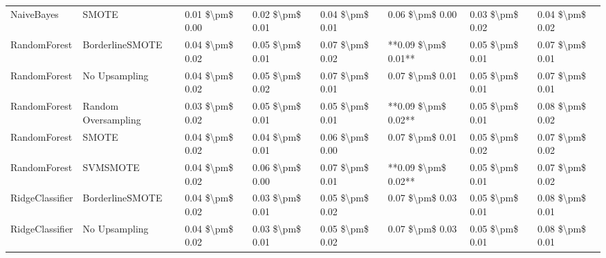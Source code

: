\begin{tabular}{llllllll}
                     NaiveBayes &                         SMOTE & 0.01 \$\textbackslash pm\$ 0.00 &           0.02 \$\textbackslash pm\$ 0.01 &       0.04 \$\textbackslash pm\$ 0.01 &        0.06 \$\textbackslash pm\$ 0.00 &                         0.03 \$\textbackslash pm\$ 0.02 &     0.04 \$\textbackslash pm\$ 0.02 \\
                   RandomForest &               BorderlineSMOTE & 0.04 \$\textbackslash pm\$ 0.02 &           0.05 \$\textbackslash pm\$ 0.01 &       0.07 \$\textbackslash pm\$ 0.02 &    **0.09 \$\textbackslash pm\$ 0.01** &                         0.05 \$\textbackslash pm\$ 0.01 &     0.07 \$\textbackslash pm\$ 0.01 \\
                   RandomForest &                 No Upsampling & 0.04 \$\textbackslash pm\$ 0.02 &           0.05 \$\textbackslash pm\$ 0.02 &       0.07 \$\textbackslash pm\$ 0.01 &        0.07 \$\textbackslash pm\$ 0.01 &                         0.05 \$\textbackslash pm\$ 0.01 &     0.07 \$\textbackslash pm\$ 0.01 \\
                   RandomForest &           Random Oversampling & 0.03 \$\textbackslash pm\$ 0.02 &           0.05 \$\textbackslash pm\$ 0.01 &       0.05 \$\textbackslash pm\$ 0.01 &    **0.09 \$\textbackslash pm\$ 0.02** &                         0.05 \$\textbackslash pm\$ 0.01 &     0.08 \$\textbackslash pm\$ 0.02 \\
                   RandomForest &                         SMOTE & 0.04 \$\textbackslash pm\$ 0.02 &           0.04 \$\textbackslash pm\$ 0.01 &       0.06 \$\textbackslash pm\$ 0.00 &        0.07 \$\textbackslash pm\$ 0.01 &                         0.05 \$\textbackslash pm\$ 0.02 &     0.07 \$\textbackslash pm\$ 0.02 \\
                   RandomForest &                      SVMSMOTE & 0.04 \$\textbackslash pm\$ 0.02 &           0.06 \$\textbackslash pm\$ 0.00 &       0.07 \$\textbackslash pm\$ 0.01 &    **0.09 \$\textbackslash pm\$ 0.02** &                         0.05 \$\textbackslash pm\$ 0.01 &     0.07 \$\textbackslash pm\$ 0.02 \\
                RidgeClassifier &               BorderlineSMOTE & 0.04 \$\textbackslash pm\$ 0.02 &           0.03 \$\textbackslash pm\$ 0.01 &       0.05 \$\textbackslash pm\$ 0.02 &        0.07 \$\textbackslash pm\$ 0.03 &                         0.05 \$\textbackslash pm\$ 0.01 &     0.08 \$\textbackslash pm\$ 0.01 \\
                RidgeClassifier &                 No Upsampling & 0.04 \$\textbackslash pm\$ 0.02 &           0.03 \$\textbackslash pm\$ 0.01 &       0.05 \$\textbackslash pm\$ 0.02 &        0.07 \$\textbackslash pm\$ 0.03 &                         0.05 \$\textbackslash pm\$ 0.01 &     0.08 \$\textbackslash pm\$ 0.01 \\

\end{tabular}
